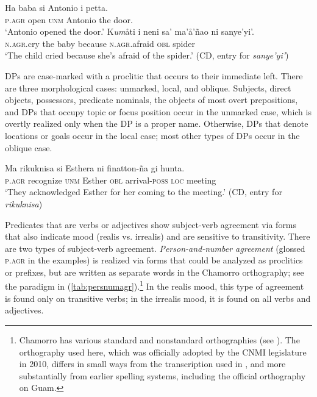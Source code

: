 \documentclass[output=paper,
modfonts
]{LSP/langsci}
\begin{document}
\begin{exe}
\ex
\begin{xlist}
\ex 
\gll Ha baba si Antonio i petta.\\
\textsc{p.agr} open \textsc{unm} Antonio the door.\\
\glt `Antonio opened the door.'
\ex \gll K\emph{um}åti i neni sa' ma'å'ñao ni sanye'yi'.\\
\textsc{n.agr.}cry the baby because \textsc{n.agr.}afraid \textsc{obl} spider\\
\glt `The child cried because she's afraid of the spider.' (CD, entry for
\emph{sanye'yi'}) 
\z
\z

DPs are case-marked with a proclitic that occurs to
their immediate left. There are three morphological cases: unmarked,
local, and oblique. Subjects, direct objects, possessors, predicate
nominals, the objects of most overt prepositions, and DPs that occupy
topic or focus position occur in the unmarked case, which is overtly
realized only when the DP is a proper name. Otherwise, DPs that denote
locations or goals occur in the local case; most other types of DPs
occur in the oblique case.

\ea
\gll Ma rikuknisa si Esthera ni finatton-ña gi hunta.\\
\textsc{p.agr} recognize \textsc{unm} Esther \textsc{obl} arrival-\textsc{poss} \textsc{loc} meeting\\
\glt `They acknowledged Esther for her coming to the meeting.' (CD, entry for \emph{rikuknisa})
\z

Predicates that are verbs or adjectives show subject-verb agreement via
forms that also indicate mood (realis vs. irrealis) and are sensitive to
transitivity. There are two types of subject-verb agreement.
\emph{Person-and-number agreement} (glossed \textsc{p.agr} in the
examples\textsc{)} is realized via forms that could be analyzed as
proclitics or prefixes, but are written as separate words in the
Chamorro orthography; see the paradigm in (\ref{tab:persnumagr}).\footnote{Chamorro has
  various standard and nonstandard orthographies (see \citealt[Appendix A]{chung1998}). The orthography used here, which was officially adopted
  by the CNMI legislature in 2010, differs in small ways from the
  transcription used in \citealt{chung1998}, and more substantially from earlier
  spelling systems, including the official orthography on Guam.} In the
realis mood, this type of agreement is found only on transitive verbs;
in the irrealis mood, it is found on all verbs and adjectives.


\end{xlist}
\end{exe}
\end{document}
